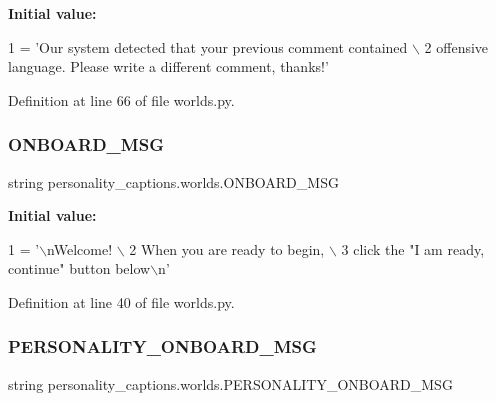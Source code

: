 {\bfseries Initial value\+:}
\begin{DoxyCode}
1 =  \textcolor{stringliteral}{'Our system detected that your previous comment contained \(\backslash\)}
2 \textcolor{stringliteral}{        offensive language. Please write a different comment, thanks!'}
\end{DoxyCode}


Definition at line 66 of file worlds.\+py.

\mbox{\label{namespacepersonality__captions_1_1worlds_a8d1b5414b6aaf085cd603488d45a1a67}} 
\subsubsection{\texorpdfstring{O\+N\+B\+O\+A\+R\+D\+\_\+\+M\+SG}{ONBOARD\_MSG}}
{\footnotesize\ttfamily string personality\+\_\+captions.\+worlds.\+O\+N\+B\+O\+A\+R\+D\+\_\+\+M\+SG}

{\bfseries Initial value\+:}
\begin{DoxyCode}
1 =  \textcolor{stringliteral}{'\(\backslash\)nWelcome! \(\backslash\)}
2 \textcolor{stringliteral}{        When you are ready to begin, \(\backslash\)}
3 \textcolor{stringliteral}{        click the "I am ready, continue" button below\(\backslash\)n'}
\end{DoxyCode}


Definition at line 40 of file worlds.\+py.

\mbox{\label{namespacepersonality__captions_1_1worlds_acbc1c1685e745a35076e4e967af4f375}} 
\subsubsection{\texorpdfstring{P\+E\+R\+S\+O\+N\+A\+L\+I\+T\+Y\+\_\+\+O\+N\+B\+O\+A\+R\+D\+\_\+\+M\+SG}{PERSONALITY\_ONBOARD\_MSG}}
{\footnotesize\ttfamily string personality\+\_\+captions.\+worlds.\+P\+E\+R\+S\+O\+N\+A\+L\+I\+T\+Y\+\_\+\+O\+N\+B\+O\+A\+R\+D\+\_\+\+M\+SG}

